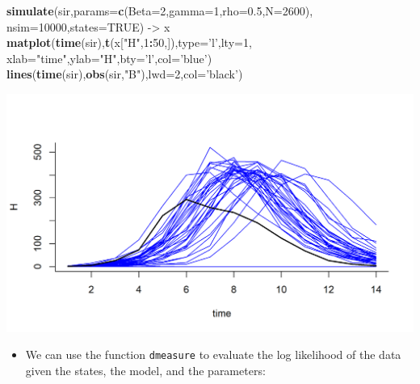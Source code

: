 \documentclass[]{article}
\newenvironment{Shaded}{\begin{snugshade}}{\end{snugshade}}
\newcommand{\KeywordTok}[1]{\textcolor[rgb]{0.13,0.29,0.53}{\textbf{#1}}}
\newcommand{\DataTypeTok}[1]{\textcolor[rgb]{0.13,0.29,0.53}{#1}}
\newcommand{\DecValTok}[1]{\textcolor[rgb]{0.00,0.00,0.81}{#1}}
\newcommand{\FloatTok}[1]{\textcolor[rgb]{0.00,0.00,0.81}{#1}}
\newcommand{\StringTok}[1]{\textcolor[rgb]{0.31,0.60,0.02}{#1}}
\newcommand{\OtherTok}[1]{\textcolor[rgb]{0.56,0.35,0.01}{#1}}
\newcommand{\OperatorTok}[1]{\textcolor[rgb]{0.81,0.36,0.00}{\textbf{#1}}}
\newcommand{\NormalTok}[1]{#1}
\providecommand{\tightlist}{%
  \setlength{\itemsep}{0pt}\setlength{\parskip}{0pt}}
\begin{document}
\begin{Shaded}
\begin{Highlighting}[]
\KeywordTok{simulate}\NormalTok{(sir,}\DataTypeTok{params=}\KeywordTok{c}\NormalTok{(}\DataTypeTok{Beta=}\DecValTok{2}\NormalTok{,}\DataTypeTok{gamma=}\DecValTok{1}\NormalTok{,}\DataTypeTok{rho=}\FloatTok{0.5}\NormalTok{,}\DataTypeTok{N=}\DecValTok{2600}\NormalTok{),}
         \DataTypeTok{nsim=}\DecValTok{10000}\NormalTok{,}\DataTypeTok{states=}\OtherTok{TRUE}\NormalTok{) ->}\StringTok{ }\NormalTok{x}
\KeywordTok{matplot}\NormalTok{(}\KeywordTok{time}\NormalTok{(sir),}\KeywordTok{t}\NormalTok{(x[}\StringTok{"H"}\NormalTok{,}\DecValTok{1}\OperatorTok{:}\DecValTok{50}\NormalTok{,]),}\DataTypeTok{type=}\StringTok{'l'}\NormalTok{,}\DataTypeTok{lty=}\DecValTok{1}\NormalTok{,}
        \DataTypeTok{xlab=}\StringTok{"time"}\NormalTok{,}\DataTypeTok{ylab=}\StringTok{"H"}\NormalTok{,}\DataTypeTok{bty=}\StringTok{'l'}\NormalTok{,}\DataTypeTok{col=}\StringTok{'blue'}\NormalTok{)}
\KeywordTok{lines}\NormalTok{(}\KeywordTok{time}\NormalTok{(sir),}\KeywordTok{obs}\NormalTok{(sir,}\StringTok{"B"}\NormalTok{),}\DataTypeTok{lwd=}\DecValTok{2}\NormalTok{,}\DataTypeTok{col=}\StringTok{'black'}\NormalTok{)}
\end{Highlighting}
\end{Shaded}

\begin{center}\includegraphics{figure/notes12-bbs-mc-like-2-1} \end{center}

\begin{itemize}
\tightlist
\item
  We can use the function \texttt{dmeasure} to evaluate the log
  likelihood of the data given the states, the model, and the
  parameters:
\end{itemize}
\end{document}

